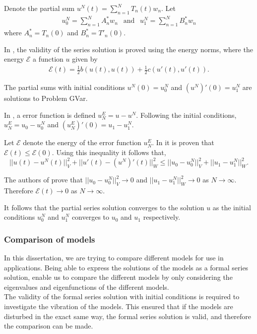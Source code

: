 \documentclass[../../main.tex]{subfiles}
\begin{document}
Denote the partial sum $u^{N}(t) = \sum_{n=1}^{N} T_{n}(t)w_n$. Let
\begin{eqnarray*}
	u_0^{N} = \sum_{n=1}^{N} A^*_n w_n \ \ \textrm{ and } \ \ u_{1}^{N} =\sum_{n=1}^{N} B^*_n w_n
\end{eqnarray*} where $A^*_n = T_n(0)$ and $B^*_n = T'_n(0)$.

In \cite{CVV18}, the validity of the series solution is proved using the energy norms, where the energy $\mathcal{E}$ a function $u$ given by
\begin{eqnarray}
	\mathcal{E} (t) = \frac{1}{2} b(u(t), u(t)) + \frac{1}{2} c(u'(t), u'(t)). \label{eq:1D_Model:ModalAnalysisEnergy}
\end{eqnarray}

The partial sums with initial conditions $u^N(0) = u^N_0$ and $(u^N)'(0) = u^N_1$ are solutions to Problem GVar.

In \cite{CVV18}, a error function is defined $u^E_N = u - u^N$. Following the initial conditions, $u^E_N = u_0 - u^N_0$ and $(u^E_N)'(0) = u_1 - u^N_1$.

Let $\mathcal{E}$ denote the energy of the error function $u^E_N$. In \cite{CVV18} it is proven that $\mathcal{E}(t) \leq \mathcal{E}(0)$. Using this inequality it follows that, \[||u(t) -  u^N(t)||_V^2 + ||u'(t) - (u^N)'(t)||^2_W \leq ||u_0 - u^N_0||_V^2 + ||u_1 - u^N_1||_W^2. \]

The authors of \cite{CVV18} prove that $||u_0 - u^N_0||_V^2 \rightarrow 0$ and $||u_1 - u^N_1||_W^2 \rightarrow 0$ as $N \rightarrow \infty$. Therefore $\mathcal{E}(t) \rightarrow 0$ as $N \rightarrow \infty$.

It follows that the partial series solution converges to the solution $u$ as the initial conditions $u_0^N$ and $u_1^N$ converges to $u_0$ and $u_1$ respectively.


\subsubsection{Comparison of models}
In this dissertation, we are trying to compare different models for use in applications. Being able to express the solutions of the models as a formal series solution, enable us to compare the different models by only considering the eigenvalues and eigenfunctions of the different models.\\

The validity of the formal series solution with initial conditions is required to investigate the vibration of the models. This ensured that if the models are disturbed in the exact same way, the formal series solution is valid, and therefore the comparison can be made.
\end{document}
